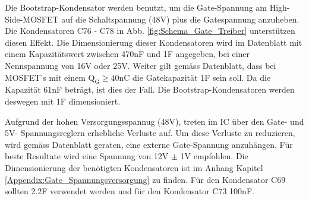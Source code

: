 

Die Bootstrap-Kondensator werden benutzt, um die Gate-Spannung am High-Side-MOSFET auf die Schaltspannung (48V) plus die Gatespannung anzuheben. Die Kondensatoren C76 - C78 in Abb. \ref{fig:Schema_Gate_Treiber} unterstützen diesen Effekt.
Die Dimensionierung dieser Kondensatoren wird im Datenblatt mit einem Kapazitätswert zwischen 470nF und 1\textmugreek F angegeben, bei einer Nennspannung von 16V oder 25V. Weiter gilt gemäss Datenblatt, dass bei MOSFET's mit einem $\mathrm{Q_G \geq 40nC}$ die Gatekapazität 1\textmugreek F sein soll. Da die Kapazität 61nF beträgt, ist dies der Fall. Die Bootstrap-Kondensatoren werden deswegen mit 1\textmugreek F dimensioniert. \cite[S.10]{trinamicmotion_control_gmbh__co_kg_tmc6200_2019}



Aufgrund der hohen Versorgungsspannug (48V), treten im IC über den Gate- und 5V- Spannungsreglern erhebliche Verluste auf. Um diese Verluste zu reduzieren, wird gemäss Datenblatt \cite[S.11]{trinamicmotion_control_gmbh__co_kg_tmc6200_2019} geraten, eine externe Gate-Spannung anzuhängen. Für beste Resultate wird eine Spannung von 12V $\pm$ 1V empfohlen.
Die Dimensionierung der benötigten Kondensatoren ist im Anhang Kapitel \ref{Appendix:Gate_Spannungsversorgung} zu finden. Für den Kondensator C69 sollten 2.2\textmugreek F verwendet werden und für den Kondensator C73 100nF.

